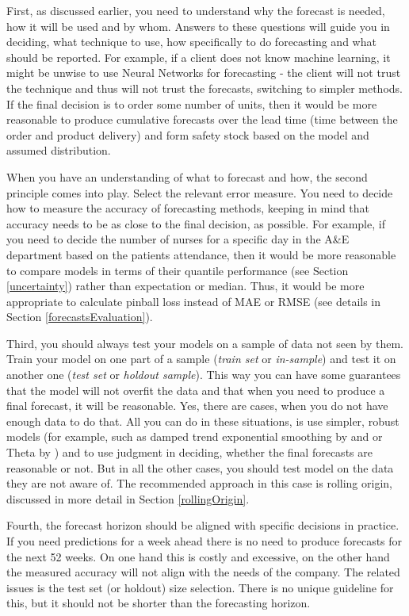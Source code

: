 \documentclass[
]{book}
\theoremstyle{definition}
\theoremstyle{definition}
\theoremstyle{definition}
\theoremstyle{definition}
\theoremstyle{remark}
\begin{document}
First, as discussed earlier, you need to understand why the forecast is needed, how it will be used and by whom. Answers to these questions will guide you in deciding, what technique to use, how specifically to do forecasting and what should be reported. For example, if a client does not know machine learning, it might be unwise to use Neural Networks for forecasting - the client will not trust the technique and thus will not trust the forecasts, switching to simpler methods. If the final decision is to order some number of units, then it would be more reasonable to produce cumulative forecasts over the lead time (time between the order and product delivery) and form safety stock based on the model and assumed distribution.

When you have an understanding of what to forecast and how, the second principle comes into play. Select the relevant error measure. You need to decide how to measure the accuracy of forecasting methods, keeping in mind that accuracy needs to be as close to the final decision, as possible. For example, if you need to decide the number of nurses for a specific day in the A\&E department based on the patients attendance, then it would be more reasonable to compare models in terms of their quantile performance (see Section \ref{uncertainty}) rather than expectation or median. Thus, it would be more appropriate to calculate pinball loss instead of MAE or RMSE (see details in Section \ref{forecastsEvaluation}).

Third, you should always test your models on a sample of data not seen by them. Train your model on one part of a sample (\emph{train set} or \emph{in-sample}) and test it on another one (\emph{test set} or \emph{holdout sample}). This way you can have some guarantees that the model will not overfit the data and that when you need to produce a final forecast, it will be reasonable. Yes, there are cases, when you do not have enough data to do that. All you can do in these situations, is use simpler, robust models (for example, such as damped trend exponential smoothing by \citet{Roberts1982} and \citet{Gardner1985a} or Theta by \citet{Assimakopoulos2000}) and to use judgment in deciding, whether the final forecasts are reasonable or not. But in all the other cases, you should test model on the data they are not aware of. The recommended approach in this case is rolling origin, discussed in more detail in Section \ref{rollingOrigin}.

Fourth, the forecast horizon should be aligned with specific decisions in practice. If you need predictions for a week ahead there is no need to produce forecasts for the next 52 weeks. On one hand this is costly and excessive, on the other hand the measured accuracy will not align with the needs of the company. The related issues is the test set (or holdout) size selection. There is no unique guideline for this, but it should not be shorter than the forecasting horizon.
\end{document}

